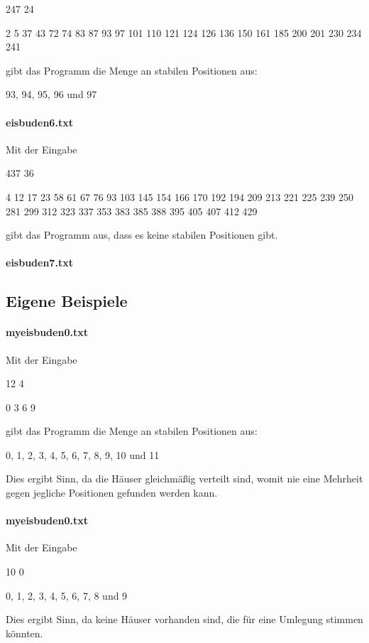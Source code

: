 \documentclass[a4paper,10pt,ngerman]{scrartcl}
\begin{document}
247 24

2 5 37 43 72 74 83 87 93 97 101 110 121 124 126 136 150 161 185 200 201 230 234 241

gibt das Programm die Menge an stabilen Positionen aus:

93, 94, 95, 96 und 97

\paragraph{eisbuden6.txt}
Mit der Eingabe

437 36

4 12 17 23 58 61 67 76 93 103 145 154 166 170 192 194 209 213 221 225 239 250 281 299 312 323 337 353 383 385 388 395 405 407 412 429

gibt das Programm aus, dass es keine stabilen Positionen gibt.

\paragraph{eisbuden7.txt}

\subsection{Eigene Beispiele}

\paragraph{myeisbuden0.txt}
Mit der Eingabe

12 4

0 3 6 9

gibt das Programm die Menge an stabilen Positionen aus:

0, 1, 2, 3, 4, 5, 6, 7, 8, 9, 10 und 11

Dies ergibt Sinn, da die Häuser gleichmäßig verteilt sind, womit nie eine Mehrheit gegen jegliche Positionen gefunden werden kann.

\paragraph{myeisbuden0.txt}
Mit der Eingabe

10 0


0, 1, 2, 3, 4, 5, 6, 7, 8 und 9

Dies ergibt Sinn, da keine Häuser vorhanden sind, die für eine Umlegung stimmen könnten.
\end{document}
